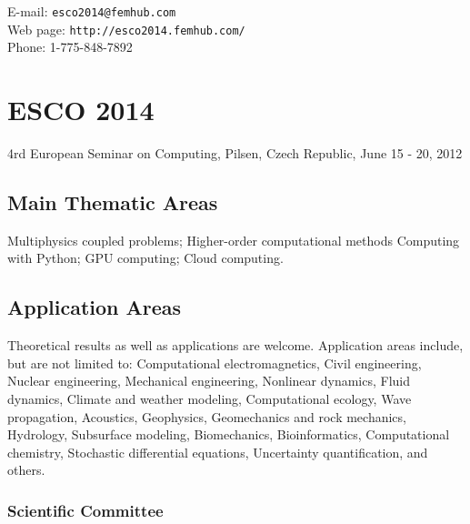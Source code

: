 \documentclass[article,A4,11pt]{llncs}%
\begin{document}
\noindent
E-mail: {\tt esco2014@femhub.com}\\
Web page: {\tt http://esco2014.femhub.com/}\\
Phone: 1-775-848-7892

\chapter*{\huge ESCO 2014}
\vspace{-5mm}
\normalsize
\begin{center}
4rd European Seminar on Computing,
Pilsen, Czech Republic,
June 15 - 20, 2012
\end{center}
\vspace{-3mm}

\section*{Main Thematic Areas}%

Multiphysics coupled problems; Higher-order computational methods
Computing with Python; GPU computing; Cloud computing.

\section*{Application Areas}%

Theoretical results as well as applications are welcome. Application areas include, but are not limited to: Computational electromagnetics, Civil engineering, Nuclear engineering, Mechanical engineering, Nonlinear dynamics, Fluid dynamics, Climate and weather modeling, Computational ecology, Wave propagation, Acoustics, Geophysics, Geomechanics and rock mechanics, Hydrology, Subsurface modeling, Biomechanics, Bioinformatics, Computational chemistry, Stochastic differential equations, Uncertainty quantification, and others.

\subsection*{Scientific Committee}%

\end{document}
